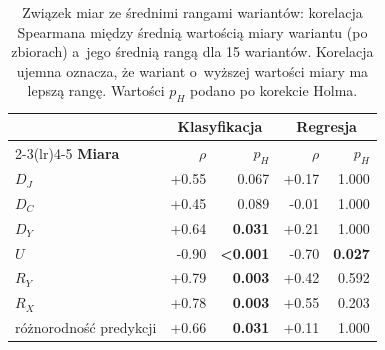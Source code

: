 \begin{table}[!htbp]
\centering\small
\caption{Związek miar ze średnimi rangami wariantów: korelacja Spearmana między średnią wartością miary wariantu (po zbiorach) a~jego średnią rangą dla 15 wariantów. Korelacja ujemna oznacza, że wariant o~wyższej wartości miary ma lepszą rangę. Wartości $p_H$ podano po korekcie Holma.}
\label{tab:miary-rangi}
\begin{tabular}{lrrrr}
\toprule
& \multicolumn{2}{c}{\textbf{Klasyfikacja}} & \multicolumn{2}{c}{\textbf{Regresja}} \\
\cmidrule(lr){2-3}\cmidrule(lr){4-5}
\textbf{Miara} & $\rho$ & $p_H$ & $\rho$ & $p_H$ \\
\midrule
$D_J$ & +0.55 & 0.067 & +0.17 & 1.000 \\
$D_C$ & +0.45 & 0.089 & -0.01 & 1.000 \\
$D_Y$ & +0.64 & \textbf{0.031} & +0.21 & 1.000 \\
$U$ & -0.90 & \textbf{<0.001} & -0.70 & \textbf{0.027} \\
$R_Y$ & +0.79 & \textbf{0.003} & +0.42 & 0.592 \\
$R_X$ & +0.78 & \textbf{0.003} & +0.55 & 0.203 \\
różnorodność predykcji & +0.66 & \textbf{0.031} & +0.11 & 1.000 \\
\bottomrule
\end{tabular}
\end{table}
